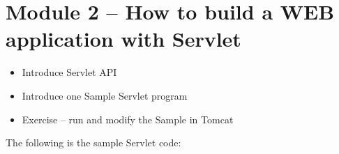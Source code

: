 \section{Module 2 -- How to build a WEB application with Servlet}

\begin{itemize}
\item Introduce Servlet API
\item Introduce one Sample Servlet program
\item Exercise -- run and modify the Sample in Tomcat
\end{itemize}

The following is the sample Servlet code:

\begin{quote}
\small
\small

\end{quote}